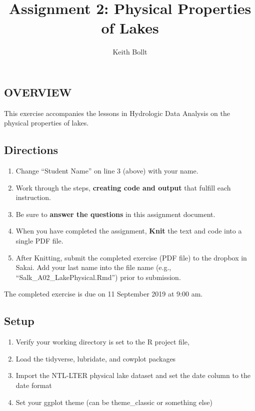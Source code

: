 \documentclass[]{article}
\title{Assignment 2: Physical Properties of Lakes}
\author{Keith Bollt}
\date{}
\providecommand{\tightlist}{%
  \setlength{\itemsep}{0pt}\setlength{\parskip}{0pt}}
\begin{document}
\maketitle

\hypertarget{overview}{%
\subsection{OVERVIEW}\label{overview}}

This exercise accompanies the lessons in Hydrologic Data Analysis on the
physical properties of lakes.

\hypertarget{directions}{%
\subsection{Directions}\label{directions}}

\begin{enumerate}
\def\labelenumi{\arabic{enumi}.}
\tightlist
\item
  Change ``Student Name'' on line 3 (above) with your name.
\item
  Work through the steps, \textbf{creating code and output} that fulfill
  each instruction.
\item
  Be sure to \textbf{answer the questions} in this assignment document.
\item
  When you have completed the assignment, \textbf{Knit} the text and
  code into a single PDF file.
\item
  After Knitting, submit the completed exercise (PDF file) to the
  dropbox in Sakai. Add your last name into the file name (e.g.,
  ``Salk\_A02\_LakePhysical.Rmd'') prior to submission.
\end{enumerate}

The completed exercise is due on 11 September 2019 at 9:00 am.

\hypertarget{setup}{%
\subsection{Setup}\label{setup}}

\begin{enumerate}
\def\labelenumi{\arabic{enumi}.}
\tightlist
\item
  Verify your working directory is set to the R project file,
\item
  Load the tidyverse, lubridate, and cowplot packages
\item
  Import the NTL-LTER physical lake dataset and set the date column to
  the date format
\item
  Set your ggplot theme (can be theme\_classic or something else)
\end{enumerate}
\end{document}

